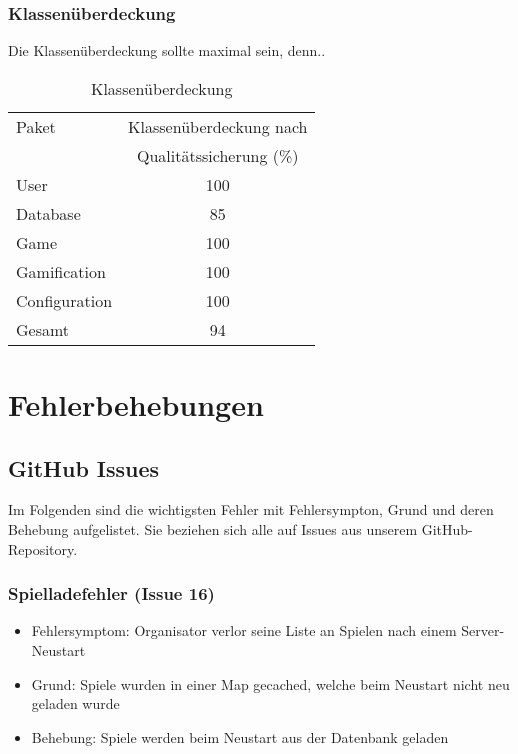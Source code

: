 \documentclass[a4paper]{scrreprt}
\begin{document}
    \subsection{Klassenüberdeckung}
    Die Klassenüberdeckung sollte maximal sein, denn..

    \vspace{20pt}
    \begin{table}[h]
        \begin{center}
        \begin{tabular}{ | l | c | }
            \hline
            Paket & Klassenüberdeckung nach \\
            & Qualitätssicherung (\%) \\ \hline
            User & 100 \\
            Database & 85 \\
            Game & 100 \\
            Gamification & 100 \\
            Configuration & 100  \\
            Gesamt & 94  \\
            \hline
        \end{tabular}
        \end{center}
        \caption{Klassenüberdeckung}
    \end{table}%


    \chapter{Fehlerbehebungen}

    \section{GitHub Issues}
    Im Folgenden sind die wichtigsten Fehler mit Fehlersympton, Grund und deren Behebung aufgelistet. Sie beziehen sich alle auf Issues
    aus unserem GitHub-Repository.

    \subsection{Spielladefehler (Issue 16)}
    \begin{itemize}
        \item Fehlersymptom: Organisator verlor seine Liste an Spielen nach einem Server-Neustart
        \item Grund: Spiele wurden in einer Map gecached, welche beim Neustart nicht neu geladen wurde
        \item Behebung: Spiele werden beim Neustart aus der Datenbank geladen
    \end{itemize}
\end{document}
